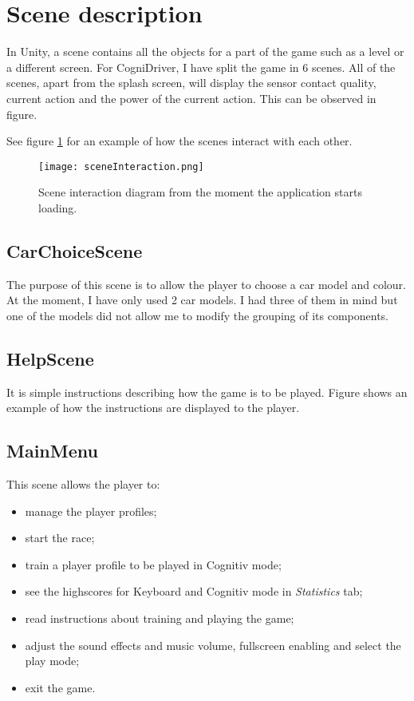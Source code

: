 \section{Scene description}
In Unity, a scene contains all the objects for a part of the game such as a level or a different screen. For CogniDriver, I have split the game in 6 scenes. All of the scenes, apart from the splash screen, will display the sensor contact quality, current action and the power of the current action. This can be observed in figure.

See figure \ref{fig:sceneInteraction} for an example of how the scenes interact with each other.

\begin{figure}
  \centering
  \texttt{[image: sceneInteraction.png]}
  \caption{Scene interaction diagram from the moment the application starts loading.}
    \label{fig:sceneInteraction}           
\end{figure}

\subsection{CarChoiceScene}
The purpose of this scene is to allow the player to choose a car model and colour. At the moment, I have only used 2 car models. I had three of them in mind but one of the models did not allow me to modify the grouping of its components. 

\subsection{HelpScene}
It is simple instructions describing how the game is to be played. Figure shows an example of how the instructions are displayed to the player.

\subsection{MainMenu}
This scene allows the player to:
\begin{itemize}
	\item manage the player profiles;
	\item start the race;
	\item train a player profile to be played in Cognitiv mode;
	\item see the highscores for Keyboard and Cognitiv mode in \textit{Statistics} tab;
	\item read instructions about training and playing the game;
	\item adjust the sound effects and music volume, fullscreen enabling and select the play mode;
	\item exit the game.
\end{itemize}

